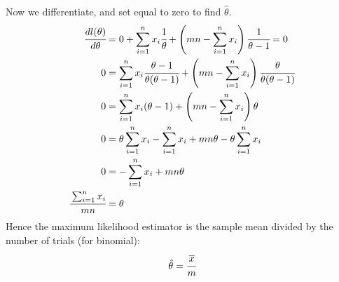 \documentclass{report}
\begin{document}
Now we differentiate, and set equal to zero to find $\hat{\theta}$.
\[\begin{split}
		\cfrac{dl(\theta)}{d\theta} &= 0 + \sum_{i=1}^nx_i\cfrac{1}{\theta} + \left( mn - \sum_{i=1}^n x_i \right)\cfrac{1}{\theta - 1}= 0 \\
		0 & = \sum_{i=1}^nx_i\cfrac{\theta - 1}{\theta(\theta - 1)} + \left( mn - \sum_{i=1}^n x_i \right)\cfrac{\theta}{\theta(\theta - 1)} \\
		0 & = \sum_{i=1}^nx_i (\theta - 1) + \left( mn - \sum_{i=1}^n x_i \right)\theta \\
		0 & = \theta\sum_{i=1}^nx_i - \sum_{i=1}^nx_i + mn\theta - \theta\sum_{i=1}^n x_i  \\
		0 & = - \sum_{i=1}^nx_i + mn\theta  \\
		\cfrac{\sum_{i=1}^nx_i}{mn} & =\theta  \\
	\end{split}\]
Hence the maximum likelihood estimator is the sample mean divided by the number of trials (for binomial):
\[\hat{\theta} = \cfrac{\overline{x}}{m}\]
\end{document}
